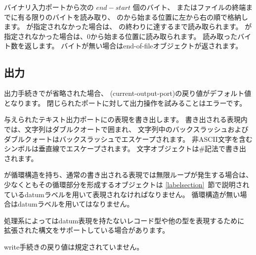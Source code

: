 \begin{entry}{%
}

バイナリ入力ポートから次の $end - start$ 個のバイト、
またはファイルの終端までに有る限りのバイトを読み取り、
のから始まる位置に左から右の順で格納します。
が指定されなかった場合は、
の終わりに達するまで読み取られます。
が指定されなかった場合は、0から始まる位置に読み取られます。
読み取ったバイト数を返します。
バイトが無い場合はend-of-fileオブジェクトが返されます。

\end{entry}


\subsection{出力}
\label{outputsection}

出力手続きでが省略された場合、
{\cf (current-output-port)}の戻り値がデフォルト値となります。
閉じられたポートに対して出力操作を試みることはエラーです。

\noindent \hbox{}
\vspace{-5ex}

\begin{entry}{%
}

与えられたテキスト出力ポートにの表現を書き出します。
書き出される表現内では、文字列はダブルクオートで囲まれ、
文字列中のバックスラッシュおよびダブルクォートはバックスラッシュでエスケープされます。
非ASCII文字を含むシンボルは垂直線でエスケープされます。
文字オブジェクトは{\cf \#\backwhack}記法で書き出されます。

が循環構造を持ち、通常の書き出される表現では無限ループが発生する場合は、
少なくともその循環部分を形成するオブジェクトは
\ref{labelsection}~節で説明されているdatumラベルを用いて表現されなければなりません。
循環構造が無い場合はdatumラベルを用いてはなりません。

処理系によってはdatum表現を持たないレコード型や他の型を表現するために
拡張された構文をサポートしている場合があります。

{\cf write}手続きの戻り値は規定されていません。

\end{entry}

